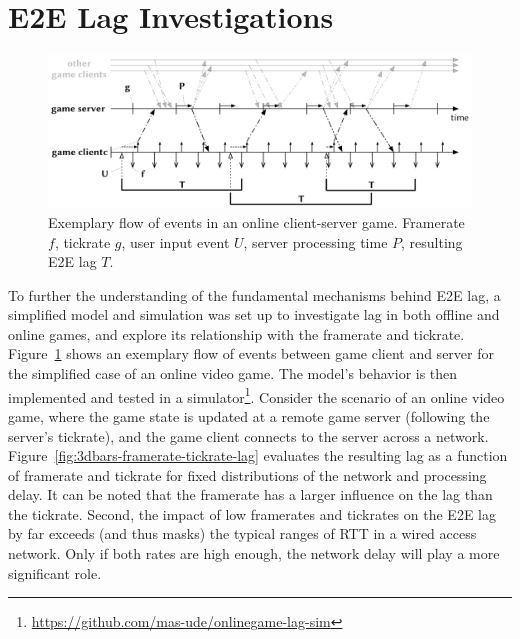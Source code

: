 \section{\gls{E2E} Lag Investigations}
\label{sec:model}

\begin{figure}[!t]
	\centering
	\includegraphics[width=1.0\columnwidth]{../../../models/tickrate-timeseries-notation.pdf}
	\caption{Exemplary flow of events in an online client-server game. Framerate $f$, tickrate $g$, user input event $U$, server processing time $P$, resulting \gls{E2E} lag $T$.
	}
\label{fig:tickrate-timeseries}
\end{figure}

To further the understanding of the fundamental mechanisms behind \gls{E2E} lag, a simplified model and simulation was set up to investigate lag in both offline and online games, and explore its relationship with the framerate and tickrate. Figure~\ref{fig:tickrate-timeseries} shows an exemplary flow of events between game client and server for the simplified case of an online video game. %
The model's behavior is then implemented and tested in a simulator\footnote{\url{https://github.com/mas-ude/onlinegame-lag-sim}}. Consider the scenario of an online video game, where the game state is updated at a remote game server (following the server's tickrate), and the game client connects to the server across a network. Figure~\ref{fig:3dbars-framerate-tickrate-lag} evaluates the resulting lag as a function of framerate and tickrate for fixed distributions of the network and processing delay. It can be noted that the framerate has a larger influence on the lag than the tickrate. Second, the impact of low framerates and tickrates on the \gls{E2E} lag by far exceeds (and thus masks) the typical ranges of \acrshort{RTT} in a wired access network. Only if both rates are high enough, the network delay will play a more significant role.

